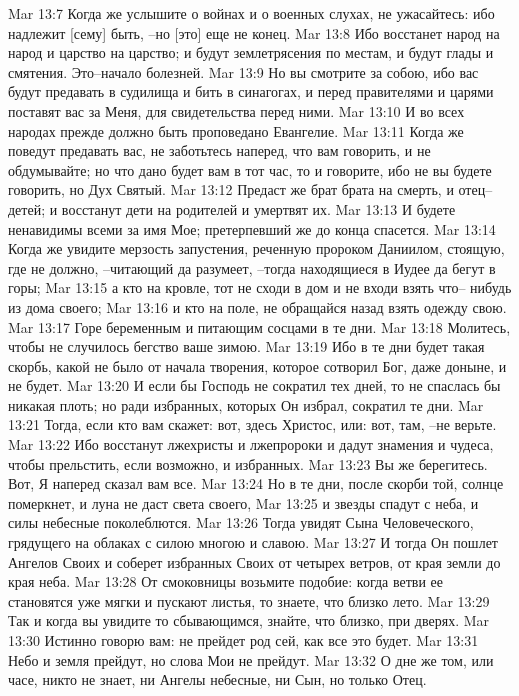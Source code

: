 Mar 13:7  Когда же услышите о войнах и о военных слухах, не ужасайтесь: ибо надлежит [сему] быть, --но [это] еще не конец.
Mar 13:8  Ибо восстанет народ на народ и царство на царство; и будут землетрясения по местам, и будут глады и смятения. Это--начало болезней.
Mar 13:9  Но вы смотрите за собою, ибо вас будут предавать в судилища и бить в синагогах, и перед правителями и царями поставят вас за Меня, для свидетельства перед ними.
Mar 13:10  И во всех народах прежде должно быть проповедано Евангелие.
Mar 13:11  Когда же поведут предавать вас, не заботьтесь наперед, что вам говорить, и не обдумывайте; но что дано будет вам в тот час, то и говорите, ибо не вы будете говорить, но Дух Святый.
Mar 13:12  Предаст же брат брата на смерть, и отец--детей; и восстанут дети на родителей и умертвят их.
Mar 13:13  И будете ненавидимы всеми за имя Мое; претерпевший же до конца спасется.
Mar 13:14  Когда же увидите мерзость запустения, реченную пророком Даниилом, стоящую, где не должно, --читающий да разумеет, --тогда находящиеся в Иудее да бегут в горы;
Mar 13:15  а кто на кровле, тот не сходи в дом и не входи взять что-- нибудь из дома своего;
Mar 13:16  и кто на поле, не обращайся назад взять одежду свою.
Mar 13:17  Горе беременным и питающим сосцами в те дни.
Mar 13:18  Молитесь, чтобы не случилось бегство ваше зимою.
Mar 13:19  Ибо в те дни будет такая скорбь, какой не было от начала творения, которое сотворил Бог, даже доныне, и не будет.
Mar 13:20  И если бы Господь не сократил тех дней, то не спаслась бы никакая плоть; но ради избранных, которых Он избрал, сократил те дни.
Mar 13:21  Тогда, если кто вам скажет: вот, здесь Христос, или: вот, там, --не верьте.
Mar 13:22  Ибо восстанут лжехристы и лжепророки и дадут знамения и чудеса, чтобы прельстить, если возможно, и избранных.
Mar 13:23  Вы же берегитесь. Вот, Я наперед сказал вам все.
Mar 13:24  Но в те дни, после скорби той, солнце померкнет, и луна не даст света своего,
Mar 13:25  и звезды спадут с неба, и силы небесные поколеблются.
Mar 13:26  Тогда увидят Сына Человеческого, грядущего на облаках с силою многою и славою.
Mar 13:27  И тогда Он пошлет Ангелов Своих и соберет избранных Своих от четырех ветров, от края земли до края неба.
Mar 13:28  От смоковницы возьмите подобие: когда ветви ее становятся уже мягки и пускают листья, то знаете, что близко лето.
Mar 13:29  Так и когда вы увидите то сбывающимся, знайте, что близко, при дверях.
Mar 13:30  Истинно говорю вам: не прейдет род сей, как все это будет.
Mar 13:31  Небо и земля прейдут, но слова Мои не прейдут.
Mar 13:32  О дне же том, или часе, никто не знает, ни Ангелы небесные, ни Сын, но только Отец.
